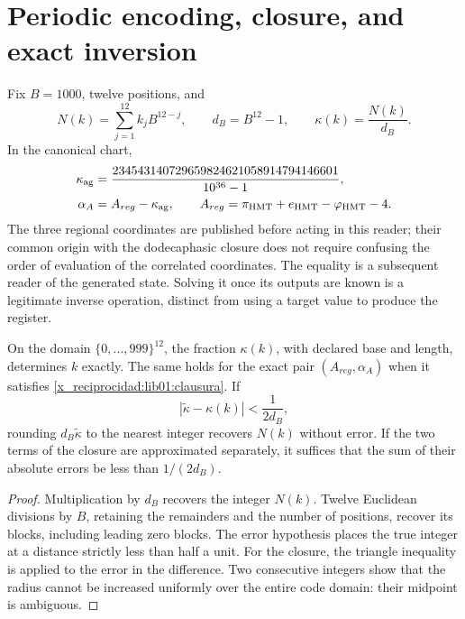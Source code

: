 \section{Periodic encoding, closure, and exact inversion}
\label{x_reciprocidad:lib01:kappa}

Fix \(B=1000\), twelve positions, and
\[
 N(k)=\sum_{j=1}^{12}k_jB^{12-j},\qquad d_B=B^{12}-1,
 \qquad \kappa(k)=\frac{N(k)}{d_B}.
\]
In the canonical chart,
\begin{equation}
 \begin{aligned}
 \kappa_{\rm ag}
 &=\frac{234543140729659824621058914794146601}{10^{36}-1},\\
 \alpha_A&=A_{reg}-\kappa_{\rm ag},\qquad
 A_{reg}=\pi_{\rm HMT}+e_{\rm HMT}-\varphi_{\rm HMT}-4.
 \end{aligned}
 \label{x_reciprocidad:lib01:clausura}
\end{equation}
The three regional coordinates are published before acting in this reader;
their common origin with the dodecaphasic closure does not require confusing the order of
evaluation of the correlated coordinates. The equality is a subsequent
reader of the generated state. Solving it once its outputs are known is
a legitimate inverse operation, distinct from using a target value to
produce the register.

\begin{proposition}
\label{x_reciprocidad:lib01:inversion-kappa}
On the domain \(\{0,\ldots,999\}^{12}\), the fraction \(\kappa(k)\), with declared base and length, determines \(k\) exactly. The same holds for the exact pair \((A_{reg},\alpha_A)\) when it satisfies \eqref{x_reciprocidad:lib01:clausura}. If
\[
 |\widetilde\kappa-\kappa(k)|<\frac1{2d_B},
\]
rounding \(d_B\widetilde\kappa\) to the nearest integer recovers \(N(k)\) without error. If the two terms of the closure are approximated separately, it suffices that the sum of their absolute errors be less than \(1/(2d_B)\).
\end{proposition}
\begin{proof}
Multiplication by \(d_B\) recovers the integer \(N(k)\). Twelve Euclidean divisions by \(B\), retaining the remainders and the number of positions, recover its blocks, including leading zero blocks. The error hypothesis places the true integer at a distance strictly less than half a unit. For the closure, the triangle inequality is applied to the error in the difference. Two consecutive integers show that the radius cannot be increased uniformly over the entire code domain: their midpoint is ambiguous.
\end{proof}

